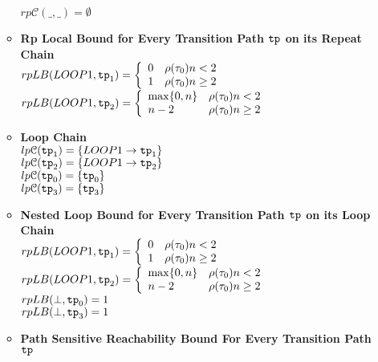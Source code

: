 \begin{example}
\begin{enumerate}
\begin{itemize}
      $rp\mathcal{C}(\_, \_) = \emptyset$ 
      \item \textbf{Rp Local Bound for Every Transition Path $\mathtt{tp}$ on its Repeat Chain}
      \\
      $rpLB(LOOP1, \tpath_1) = 
      \left\{
        \begin{array}{ll}
        0 & \env(\trace_0)  n < 2 \\
        1 & \env(\trace_0)  n \geq 2
        \end{array} 
      \right.$
      \\
      $rpLB(LOOP1, \tpath_2) =     
      \left\{
        \begin{array}{ll}
        \max\{0, n\} & \env(\trace_0) n < 2 \\
        n - 2 & \env(\trace_0)  n \geq 2
        \end{array} 
      \right.$
      \item \textbf{Loop Chain}
      \\
      $lp\mathcal{C}(\mathtt{tp}_1) = \{LOOP1\to \mathtt{tp}_1\}$ \\
      $lp\mathcal{C}(\mathtt{tp}_2) = \{LOOP1\to \mathtt{tp}_2\}$ \\
      $lp\mathcal{C}(\mathtt{tp}_0) = \{\mathtt{tp}_0\}$ \\
      $lp\mathcal{C}(\mathtt{tp}_3) = \{\mathtt{tp}_3\}$ 
      \item \textbf{Nested Loop Bound for Every Transition Path $\mathtt{tp}$ on its Loop Chain}
      \\
      $rpLB(LOOP1, \tpath_1) =       
      \left\{
        \begin{array}{ll}
        0 & \env(\trace_0)  n < 2 \\
        1 & \env(\trace_0)  n \geq 2
        \end{array} 
      \right.$
      \\
      $rpLB(LOOP1, \tpath_2) = 
      \left\{
        \begin{array}{ll}
        \max\{0, n\} & \env(\trace_0) n < 2 \\
        n - 2 & \env(\trace_0)  n \geq 2
        \end{array} 
      \right.$
       \\
      $rpLB(\bot, \mathtt{tp}_0) = 1$ \\
      $rpLB(\bot, \mathtt{tp}_3) = 1$ 
      \item \textbf{Path Sensitive Reachability Bound For Every Transition Path $\mathtt{tp}$ }
      \\

\end{itemize}
\end{enumerate}
\end{example}
